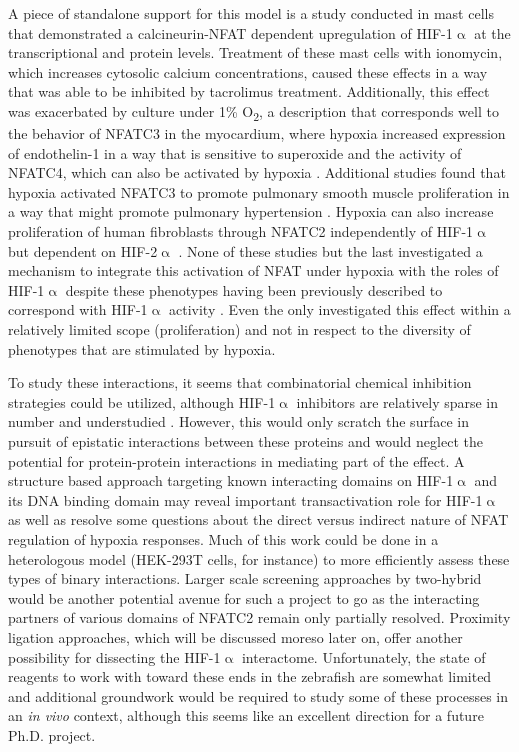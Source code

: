A piece of standalone support for this model is a study conducted in mast cells that demonstrated a calcineurin-NFAT dependent upregulation of HIF-1$\upalpha$ at the transcriptional and protein levels. Treatment of these mast cells with ionomycin, which increases cytosolic calcium concentrations, caused these effects in a way that was able to be inhibited by tacrolimus treatment. Additionally, this effect was exacerbated by culture under 1\% O\textsubscript{2}, a description that corresponds well to the behavior of NFATC3 in the myocardium, where hypoxia increased expression of endothelin-1 in a way that is sensitive to superoxide and the activity of NFATC4, which can also be activated by hypoxia \citep{deFrutos2011, RamiroDiaz2014, Moreno2015}. Additional studies found that hypoxia activated NFATC3 to promote pulmonary smooth muscle proliferation in a way that might promote pulmonary hypertension \citep{Hou2013}. Hypoxia can also increase proliferation of human fibroblasts through NFATC2 independently of HIF-1$\upalpha$ but dependent on HIF-2$\upalpha$ \citep{Senavirathna2018}. None of these studies but the last investigated a mechanism to integrate this activation of NFAT under hypoxia with the roles of HIF-1$\upalpha$ despite these phenotypes having been previously described to correspond with HIF-1$\upalpha$ activity \citep{Cui2021, Qi2017, Li2014, Thackaberry2002, SonanezOrganis2016}. Even the \citeauthor{Senavirathna2018} only investigated this effect within a relatively limited scope (proliferation) and not in respect to the diversity of phenotypes that are stimulated by hypoxia.

To study these interactions, it seems that combinatorial chemical inhibition strategies could be utilized, although HIF-1$\upalpha$ inhibitors are relatively sparse in number and understudied \citep{Viziteu2016}. However, this would only scratch the surface in pursuit of epistatic interactions between these proteins and would neglect the potential for protein-protein interactions in mediating part of the effect. A structure based approach targeting known interacting domains on HIF-1$\upalpha$ and its DNA binding domain may reveal important transactivation role for HIF-1$\upalpha$ as well as resolve some questions about the direct versus indirect nature of NFAT regulation of hypoxia responses. Much of this work could be done in a heterologous model (HEK-293T cells, for instance) to more efficiently assess these types of binary interactions. Larger scale screening approaches by two-hybrid would be another potential avenue for such a project to go as the interacting partners of various domains of NFATC2 remain only partially resolved. Proximity ligation approaches, which will be discussed moreso later on, offer another possibility for dissecting the HIF-1$\upalpha$ interactome. Unfortunately, the state of reagents to work with toward these ends in the zebrafish are somewhat limited and additional groundwork would be required to study some of these processes in an \textit{in vivo} context, although this seems like an excellent direction for a future Ph.D. project.

